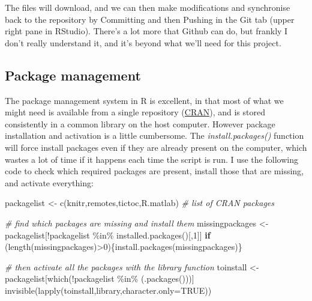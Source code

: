 \documentclass[
]{article}
\newenvironment{Shaded}{\begin{snugshade}}{\end{snugshade}}
\newcommand{\AttributeTok}[1]{\textcolor[rgb]{0.77,0.63,0.00}{#1}}
\newcommand{\CommentTok}[1]{\textcolor[rgb]{0.56,0.35,0.01}{\textit{#1}}}
\newcommand{\ConstantTok}[1]{\textcolor[rgb]{0.00,0.00,0.00}{#1}}
\newcommand{\ControlFlowTok}[1]{\textcolor[rgb]{0.13,0.29,0.53}{\textbf{#1}}}
\newcommand{\DecValTok}[1]{\textcolor[rgb]{0.00,0.00,0.81}{#1}}
\newcommand{\FunctionTok}[1]{\textcolor[rgb]{0.00,0.00,0.00}{#1}}
\newcommand{\NormalTok}[1]{#1}
\newcommand{\OtherTok}[1]{\textcolor[rgb]{0.56,0.35,0.01}{#1}}
\newcommand{\SpecialCharTok}[1]{\textcolor[rgb]{0.00,0.00,0.00}{#1}}
\newcommand{\StringTok}[1]{\textcolor[rgb]{0.31,0.60,0.02}{#1}}
\begin{document}
The files will download, and we can then make modifications and synchronise back to the repository by Committing and then Pushing in the Git tab (upper right pane in RStudio). There's a lot more that Github can do, but frankly I don't really understand it, and it's beyond what we'll need for this project.

\hypertarget{package-management}{%
\subsection{Package management}\label{package-management}}

The package management system in R is excellent, in that most of what we might need is available from a single repository (\href{https://cran.r-project.org/}{CRAN}), and is stored consistently in a common library on the host computer. However package installation and activation is a little cumbersome. The \emph{install.packages()} function will force install packages even if they are already present on the computer, which wastes a lot of time if it happens each time the script is run. I use the following code to check which required packages are present, install those that are missing, and activate everything:

\begin{Shaded}
\begin{Highlighting}[]
\NormalTok{packagelist }\OtherTok{\textless{}{-}} \FunctionTok{c}\NormalTok{(}\StringTok{\textquotesingle{}knitr\textquotesingle{}}\NormalTok{,}\StringTok{\textquotesingle{}remotes\textquotesingle{}}\NormalTok{,}\StringTok{\textquotesingle{}tictoc\textquotesingle{}}\NormalTok{,}\StringTok{\textquotesingle{}R.matlab\textquotesingle{}}\NormalTok{) }\CommentTok{\# list of CRAN packages}

\CommentTok{\# find which packages are missing and install them}
\NormalTok{missingpackages }\OtherTok{\textless{}{-}}\NormalTok{ packagelist[}\SpecialCharTok{!}\NormalTok{packagelist }\SpecialCharTok{\%in\%} \FunctionTok{installed.packages}\NormalTok{()[,}\DecValTok{1}\NormalTok{]]}
\ControlFlowTok{if}\NormalTok{ (}\FunctionTok{length}\NormalTok{(missingpackages)}\SpecialCharTok{\textgreater{}}\DecValTok{0}\NormalTok{)\{}\FunctionTok{install.packages}\NormalTok{(missingpackages)\}}

\CommentTok{\# then activate all the packages with the library function}
\NormalTok{toinstall }\OtherTok{\textless{}{-}}\NormalTok{ packagelist[}\FunctionTok{which}\NormalTok{(}\SpecialCharTok{!}\NormalTok{packagelist }\SpecialCharTok{\%in\%}\NormalTok{ (}\FunctionTok{.packages}\NormalTok{()))]}
\FunctionTok{invisible}\NormalTok{(}\FunctionTok{lapply}\NormalTok{(toinstall,library,}\AttributeTok{character.only=}\ConstantTok{TRUE}\NormalTok{))}
\end{Highlighting}
\end{Shaded}
\end{document}
